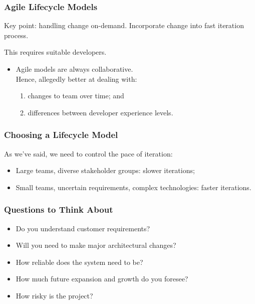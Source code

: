 \begin{frame}
\frametitle{Agile Lifecycle Models}

\begin{changemargin}{1cm}
Key point: handling change on-demand.
Incorporate change into fast iteration process.

This requires suitable developers.
\begin{itemize}
\item Agile models are always collaborative.\\
 Hence, allegedly better at dealing with:
\begin{enumerate}
\item changes to team over time; and
\item differences between developer experience levels.
\end{enumerate}
\end{itemize}

\end{changemargin}
\end{frame}


\begin{frame}
\frametitle{Choosing a Lifecycle Model}

\begin{changemargin}{1cm}
As we've said, we need to control the pace of iteration:
\begin{itemize}
\item Large teams, diverse stakeholder groups: slower iterations;
\item Small teams, uncertain requirements, complex technologies: faster iterations.
\end{itemize}
\end{changemargin}

\end{frame}


\begin{frame}
\frametitle{Questions to Think About}

\large
\begin{changemargin}{0.5cm}
\begin{itemize}
\item Do you understand customer requirements?\\[0.5em]
\item Will you need to make major architectural changes?\\[0.5em]
\item How reliable does the system need to be?\\[0.5em]
\item How much future expansion and growth do you foresee?\\[0.5em]
\item How risky is the project?
\end{itemize}
\end{changemargin}
\end{frame}

